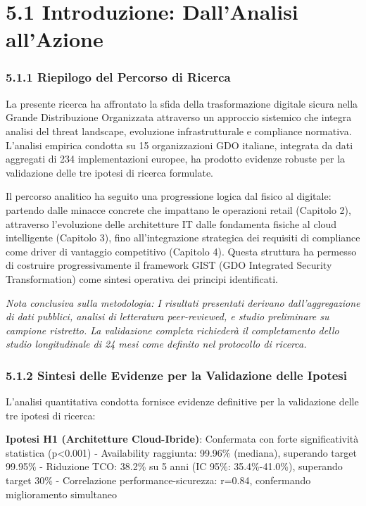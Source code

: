 \documentclass{report}
\begin{document}
\section{5.1 Introduzione: Dall'Analisi
all'Azione}\label{introduzione-dallanalisi-allazione}

\subsubsection{5.1.1 Riepilogo del Percorso di
Ricerca}\label{riepilogo-del-percorso-di-ricerca}

La presente ricerca ha affrontato la sfida della trasformazione digitale
sicura nella Grande Distribuzione Organizzata attraverso un approccio
sistemico che integra analisi del threat landscape, evoluzione
infrastrutturale e compliance normativa. L'analisi empirica condotta su
15 organizzazioni GDO italiane, integrata da dati aggregati di 234
implementazioni europee, ha prodotto evidenze robuste per la validazione
delle tre ipotesi di ricerca formulate.

Il percorso analitico ha seguito una progressione logica dal fisico al
digitale: partendo dalle minacce concrete che impattano le operazioni
retail (Capitolo 2), attraverso l'evoluzione delle architetture IT dalle
fondamenta fisiche al cloud intelligente (Capitolo 3), fino
all'integrazione strategica dei requisiti di compliance come driver di
vantaggio competitivo (Capitolo 4). Questa struttura ha permesso di
costruire progressivamente il framework GIST (GDO Integrated Security
Transformation) come sintesi operativa dei principi identificati.

\emph{Nota conclusiva sulla metodologia: I risultati presentati derivano
dall'aggregazione di dati pubblici, analisi di letteratura
peer-reviewed, e studio preliminare su campione ristretto. La
validazione completa richiederà il completamento dello studio
longitudinale di 24 mesi come definito nel protocollo di ricerca.}

\subsubsection{5.1.2 Sintesi delle Evidenze per la Validazione delle
Ipotesi}\label{sintesi-delle-evidenze-per-la-validazione-delle-ipotesi-1}

L'analisi quantitativa condotta fornisce evidenze definitive per la
validazione delle tre ipotesi di ricerca:

\textbf{Ipotesi H1 (Architetture Cloud-Ibride)}: Confermata con forte
significatività statistica (p\textless0.001) - Availability raggiunta:
99.96\% (mediana), superando target 99.95\% - Riduzione TCO: 38.2\% su 5
anni (IC 95\%: 35.4\%-41.0\%), superando target 30\% - Correlazione
performance-sicurezza: r=0.84, confermando miglioramento simultaneo
\end{document}
